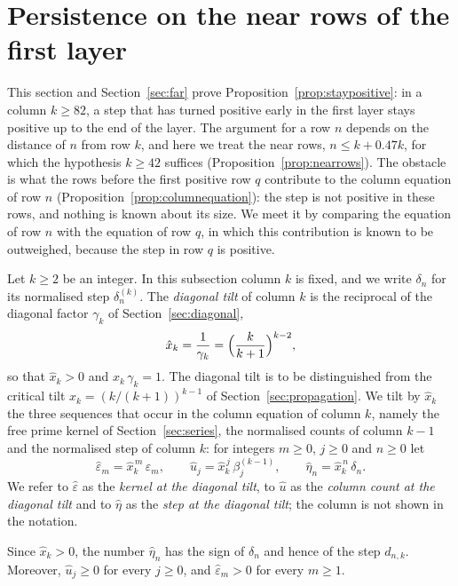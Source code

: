 \documentclass{amsart}
\makeatletter
\theoremstyle{definition}
\theoremstyle{remark}
\numberwithin{equation}{section}
\def\subsection{\@startsection{subsection}{2}\z@{.5\linespacing\@plus.7\linespacing}{-.5em}{\normalfont\bfseries\boldmath}}
\makeatother
\begin{document}
\section{Persistence on the near rows of the first layer}\label{sec:near}
This section and Section~\ref{sec:far} prove
Proposition~\ref{prop:staypositive}: in a column $k\ge82$, a step that has
turned positive early in the first layer stays positive up to the end of the
layer. The argument for a row $n$ depends on
the distance of $n$ from row $k$, and here we treat the near rows,
$n\le k+0.47k$, for which the hypothesis $k\ge42$ suffices
(Proposition~\ref{prop:nearrows}). The obstacle is what the rows before the
first positive row $q$ contribute to the column equation of row $n$
(Proposition~\ref{prop:columnequation}): the step is not positive in these
rows, and nothing is known about its size. We meet it
by comparing the equation of row $n$ with the equation of row $q$, in which
this contribution is known to be outweighed, because the step in row $q$ is
positive.

\subsection{The diagonal tilt}\label{subsec:near-tilt}

Let $k\ge2$ be an integer. In this subsection column $k$ is fixed, and we
write $\delta_n$ for its normalised step $\delta^{(k)}_n$. The
\emph{diagonal tilt} of column $k$ is the reciprocal of the diagonal factor
$\gamma_k$ of Section~\ref{sec:diagonal},
\[
\hat x_k=\frac{1}{\gamma_k}=\Bigl(\frac{k}{k+1}\Bigr)^{k-2},
\]
so that $\hat x_k>0$ and $\hat x_k\,\gamma_k=1$. The diagonal tilt is to be
distinguished from the critical tilt $x_k=(k/(k+1))^{k-1}$ of
Section~\ref{sec:propagation}. We tilt by $\hat x_k$
the three sequences that occur in the column equation of column $k$, namely
the free prime kernel of Section~\ref{sec:series}, the normalised counts of
column $k-1$ and the normalised step of column $k$: for
integers $m\ge0$, $j\ge0$ and $n\ge0$ let
\[
\hat\varepsilon_m=\hat x_k^{\,m}\,\varepsilon_m,\qquad
\hat u_j=\hat x_k^{\,j}\,\beta^{(k-1)}_j,\qquad
\hat\eta_n=\hat x_k^{\,n}\,\delta_n .
\]
We refer to $\hat\varepsilon$ as the \emph{kernel at the diagonal tilt}, to
$\hat u$ as the \emph{column count at the diagonal tilt} and to $\hat\eta$
as the \emph{step at the diagonal tilt}; the column is not shown in the
notation.

Since $\hat x_k>0$, the number $\hat\eta_n$ has the sign of $\delta_n$
and hence of the step $d_{n,k}$. Moreover, $\hat u_j\ge0$ for every $j\ge0$,
and $\hat\varepsilon_m>0$ for every $m\ge1$.
\end{document}
